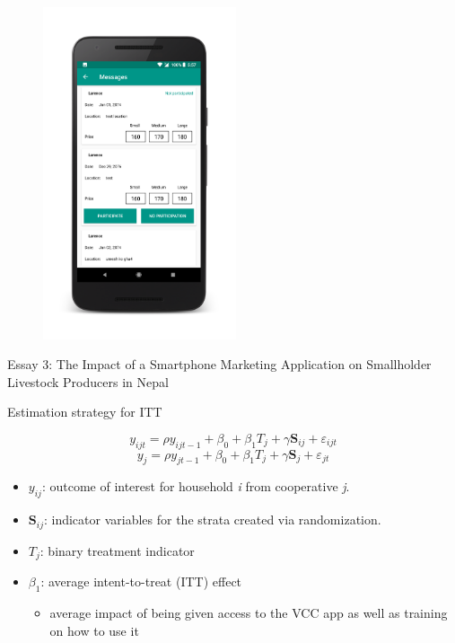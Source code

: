 \documentclass[aspectratio=169]{beamer}
\newenvironment{wideitemize}{\itemize\addtolength{\itemsep}{10pt}}{\enditemize}
\begin{document}
\begin{frame}
\begin{figure}[!h]
\begin{minipage}{.2\textwidth}
    \includegraphics[width=5.7cm]{vcc3.png}
  \end{minipage}
\end{figure}
\end{frame}

\begin{frame}{Essay 3: The Impact of a Smartphone Marketing Application on Smallholder Livestock Producers in Nepal}

\begin{wideitemize}
    \item Estimation strategy for ITT

\begin{equation} \label{eq:ITT1}
y_{ijt} = \rho y_{ijt-1} + \beta_{0} + \beta_{1} T_{j} + \gamma \textbf{S}_{ij} + \varepsilon_{ijt}
\end{equation}
\begin{equation} \label{eq:ITT2}
y_{j} = \rho y_{jt-1} + \beta_{0} + \beta_{1} T_{j} + \gamma \textbf{S}_{j} + \varepsilon_{jt}
\end{equation}

    \vspace{.25cm}
    \begin{itemize}
        \item $y_{ij}$: outcome of interest for household \textit{i} from cooperative \textit{j}. \item $\textbf{S}_{ij}$: indicator variables for the strata created via randomization. \item $T_{j}$: binary treatment indicator
        \item $\beta_{1}$: average intent-to-treat (ITT) effect
            \begin{itemize}
                \item average impact of being given access to the VCC app as well as training on how to use it
            \end{itemize}
    \end{itemize}
\end{wideitemize}
\end{frame}
\end{document}
